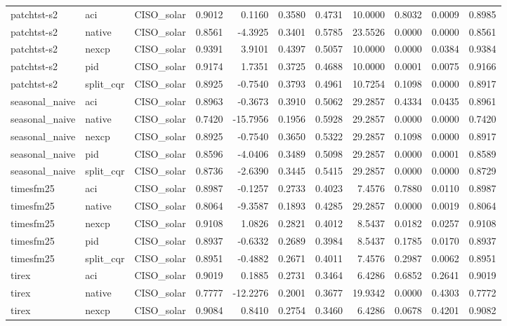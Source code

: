 \begin{tabular}{lllrrrrrrrr}
patchtst-s2 & aci & CISO_solar & 0.9012 & 0.1160 & 0.3580 & 0.4731 & 10.0000 & 0.8032 & 0.0009 & 0.8985 \\
patchtst-s2 & native & CISO_solar & 0.8561 & -4.3925 & 0.3401 & 0.5785 & 23.5526 & 0.0000 & 0.0000 & 0.8561 \\
patchtst-s2 & nexcp & CISO_solar & 0.9391 & 3.9101 & 0.4397 & 0.5057 & 10.0000 & 0.0000 & 0.0384 & 0.9384 \\
patchtst-s2 & pid & CISO_solar & 0.9174 & 1.7351 & 0.3725 & 0.4688 & 10.0000 & 0.0001 & 0.0075 & 0.9166 \\
patchtst-s2 & split_cqr & CISO_solar & 0.8925 & -0.7540 & 0.3793 & 0.4961 & 10.7254 & 0.1098 & 0.0000 & 0.8917 \\
seasonal_naive & aci & CISO_solar & 0.8963 & -0.3673 & 0.3910 & 0.5062 & 29.2857 & 0.4334 & 0.0435 & 0.8961 \\
seasonal_naive & native & CISO_solar & 0.7420 & -15.7956 & 0.1956 & 0.5928 & 29.2857 & 0.0000 & 0.0000 & 0.7420 \\
seasonal_naive & nexcp & CISO_solar & 0.8925 & -0.7540 & 0.3650 & 0.5322 & 29.2857 & 0.1098 & 0.0000 & 0.8917 \\
seasonal_naive & pid & CISO_solar & 0.8596 & -4.0406 & 0.3489 & 0.5098 & 29.2857 & 0.0000 & 0.0001 & 0.8589 \\
seasonal_naive & split_cqr & CISO_solar & 0.8736 & -2.6390 & 0.3445 & 0.5415 & 29.2857 & 0.0000 & 0.0000 & 0.8729 \\
timesfm25 & aci & CISO_solar & 0.8987 & -0.1257 & 0.2733 & 0.4023 & 7.4576 & 0.7880 & 0.0110 & 0.8987 \\
timesfm25 & native & CISO_solar & 0.8064 & -9.3587 & 0.1893 & 0.4285 & 29.2857 & 0.0000 & 0.0019 & 0.8064 \\
timesfm25 & nexcp & CISO_solar & 0.9108 & 1.0826 & 0.2821 & 0.4012 & 8.5437 & 0.0182 & 0.0257 & 0.9108 \\
timesfm25 & pid & CISO_solar & 0.8937 & -0.6332 & 0.2689 & 0.3984 & 8.5437 & 0.1785 & 0.0170 & 0.8937 \\
timesfm25 & split_cqr & CISO_solar & 0.8951 & -0.4882 & 0.2671 & 0.4011 & 7.4576 & 0.2987 & 0.0062 & 0.8951 \\
tirex & aci & CISO_solar & 0.9019 & 0.1885 & 0.2731 & 0.3464 & 6.4286 & 0.6852 & 0.2641 & 0.9019 \\
tirex & native & CISO_solar & 0.7777 & -12.2276 & 0.2001 & 0.3677 & 19.9342 & 0.0000 & 0.4303 & 0.7772 \\
tirex & nexcp & CISO_solar & 0.9084 & 0.8410 & 0.2754 & 0.3460 & 6.4286 & 0.0678 & 0.4201 & 0.9082 \\

\end{tabular}
